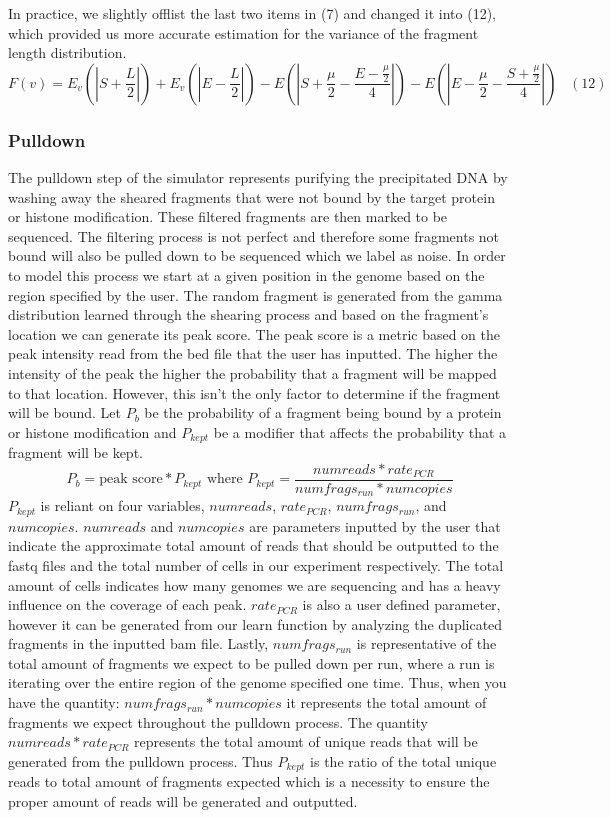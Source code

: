 \documentclass[12pt]{article}
\begin{document}
In practice, we slightly offlist the last two items in (7) and changed it into (12), which provided us more accurate estimation for the variance of the fragment length distribution.
$$F(v) = E_v(|S + \frac{L}{2}|) + E_v(|E - \frac{L}{2}|) - E(|S + \frac{\mu}{2} - \frac{E- \frac{\mu}{2}}{4}|) - E(|E- \frac{\mu}{2} - \frac{S + \frac{\mu}{2}}{4}|)\;\;\;(12)$$


\subsubsection*{Pulldown}

The pulldown step of the simulator represents purifying the precipitated DNA by washing away the sheared fragments that were not bound by the target protein or histone modification. These filtered fragments are then marked to be sequenced. The filtering process is not perfect and therefore some fragments not bound will also be pulled down to be sequenced which we label as noise. In order to model this process we start at a given position in the genome based on the region specified by the user. The random fragment is generated from the gamma distribution learned through the shearing process and based on the fragment's location we can generate its peak score. The peak score is a metric based on the peak intensity read from the bed file that the user has inputted. The higher the intensity of the peak the higher the probability that a fragment will be mapped to that location. However, this isn't the only factor to determine if the fragment will be bound. Let $P_b$ be the probability of a fragment being bound by a protein or histone modification and $P_{kept}$ be a modifier that affects the probability that a fragment will be kept. 
$$P_b = \text{peak score} * P_{kept} \text{ where } P_{kept} = \dfrac{numreads * rate_{PCR}}{numfrags_{run} * numcopies}$$
$P_{kept}$ is reliant on four variables, $numreads$, $rate_{PCR}$, $numfrags_{run}$, and $numcopies$. $numreads$ and $numcopies$ are parameters inputted by the user that indicate the approximate total amount of reads that should be outputted to the fastq files and the total number of cells in our experiment respectively. The total amount of cells indicates how many genomes we are sequencing and has a heavy influence on the coverage of each peak. $rate_{PCR}$ is also a user defined parameter, however it can be generated from our learn function by analyzing the duplicated fragments in the inputted bam file. Lastly, $numfrags_{run}$ is representative of the total amount of fragments we expect to be pulled down per run, where a run is iterating over the entire region of the genome specified one time. Thus, when you have the quantity: $numfrags_{run}*numcopies$ it represents the total amount of fragments we expect throughout the pulldown process. The quantity $numreads*rate_{PCR}$ represents the total amount of unique reads that will be generated from the pulldown process. Thus $P_{kept}$ is the ratio of the total unique reads to total amount of fragments expected which is a necessity to ensure the proper amount of reads will be generated and outputted. 
\end{document}

